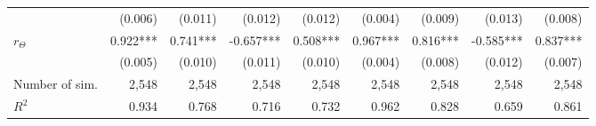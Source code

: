 \begin{table}
{\begin{tabular}{lrrrrrrrr}
                &                  (0.006) &                  (0.011) &                  (0.012) &                  (0.012) &                  (0.004) &                  (0.009) &                  (0.013) &                  (0.008)\\ 
    $r_\Theta$  &                 0.922*** &                 0.741*** &                -0.657*** &                 0.508*** &                 0.967*** &                 0.816*** &                -0.585*** &                 0.837***\\ 
                &                  (0.005) &                  (0.010) &                  (0.011) &                  (0.010) &                  (0.004) &                  (0.008) &                  (0.012) &                  (0.007)\\ 
    \hline
Number of sim.  &                    2,548 &                    2,548 &                    2,548 &                    2,548 &                    2,548 &                    2,548 &                    2,548 &                    2,548\\ 
    $R^2$       &                    0.934 &                    0.768 &                    0.716 &                    0.732 &                    0.962 &                    0.828 &                    0.659 &                    0.861\\ 
    \bottomrule
    \end{tabular}}
\label{tableSI:coefficients_trait-dep-comp}
\end{table}

